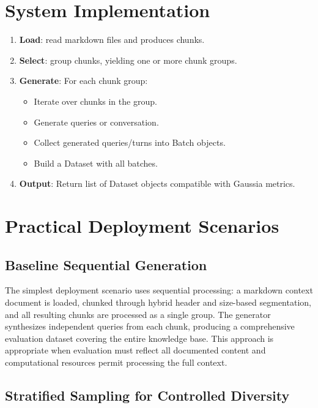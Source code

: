 \documentclass[11pt,a4paper]{article}
\begin{document}
\section{System Implementation}

\begin{enumerate}
    \item \textbf{Load}: read markdown files and produces chunks.

    \item \textbf{Select}: group chunks, yielding one or more chunk groups.

    \item \textbf{Generate}: For each chunk group:

    \begin{itemize}
        \item Iterate over chunks in the group.
        \item Generate queries or conversation.
        \item Collect generated queries/turns into Batch objects.
        \item Build a Dataset with all batches.
    \end{itemize}

    \item \textbf{Output}: Return list of Dataset objects compatible with Gaussia metrics.
\end{enumerate}

\section{Practical Deployment Scenarios}

\subsection{Baseline Sequential Generation}

The simplest deployment scenario uses sequential processing: a markdown context document is loaded, chunked through hybrid header and size-based segmentation, and all resulting chunks are processed as a single group. The generator synthesizes independent queries from each chunk, producing a comprehensive evaluation dataset covering the entire knowledge base. This approach is appropriate when evaluation must reflect all documented content and computational resources permit processing the full context.

\subsection{Stratified Sampling for Controlled Diversity}
\end{document}
